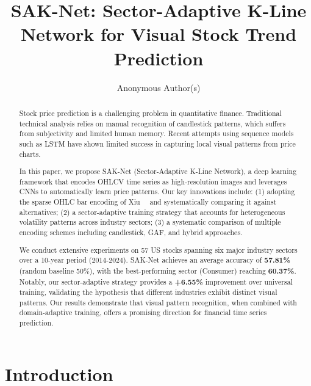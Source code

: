 \documentclass[runningheads]{llncs}
\begin{document}
\title{SAK-Net: Sector-Adaptive K-Line Network for Visual Stock Trend Prediction}
\author{Anonymous Author(s)}

\maketitle

\begin{abstract}
Stock price prediction is a challenging problem in quantitative finance. Traditional technical analysis relies on manual recognition of candlestick patterns, which suffers from subjectivity and limited human memory. Recent attempts using sequence models such as LSTM have shown limited success in capturing local visual patterns from price charts. 

In this paper, we propose SAK-Net (Sector-Adaptive K-Line Network), a deep learning framework that encodes OHLCV time series as high-resolution images and leverages CNNs to automatically learn price patterns. Our key innovations include: (1) adopting the sparse OHLC bar encoding of Xiu~\etal~\cite{Xiu21} and systematically comparing it against alternatives; (2) a sector-adaptive training strategy that accounts for heterogeneous volatility patterns across industry sectors; (3) a systematic comparison of multiple encoding schemes including candlestick, GAF, and hybrid approaches.

We conduct extensive experiments on 57 US stocks spanning six major industry sectors over a 10-year period (2014-2024). SAK-Net achieves an average accuracy of \textbf{57.81\%} (random baseline 50\%), with the best-performing sector (Consumer) reaching \textbf{60.37\%}. Notably, our sector-adaptive strategy provides a \textbf{+6.55\%} improvement over universal training, validating the hypothesis that different industries exhibit distinct visual patterns. Our results demonstrate that visual pattern recognition, when combined with domain-adaptive training, offers a promising direction for financial time series prediction.

\end{abstract}


\section{Introduction}
\label{sec:intro}
\end{document}
